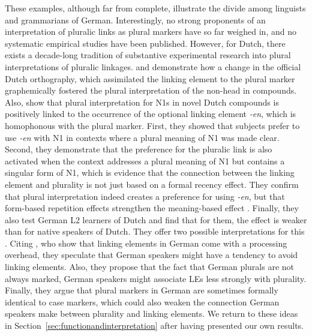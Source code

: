 These examples, although far from complete, illustrate the divide among linguists and grammarians of German.
Interestingly, no strong proponents of an interpretation of pluralic links as plural markers have so far weighed in, and no systematic empirical studies have been published.
However, for Dutch, there exists a decade-long tradition of substantive experimental research into plural interpretations of pluralic linkages.
\textcite{SchreuderEa1998} and \textcite{BangaEa2012} demonstrate how a change in the official Dutch orthography, which assimilated the linking element to the plural marker graphemically fostered the plural interpretation of the non-head in compounds.
Also, \textcite{BangaEa2013a} show that plural interpretation for N1s in novel Dutch compounds is positively linked to the occurrence of the optional linking element \textit{-en}, which is homophonous with the plural marker.
First, they showed that subjects prefer to use \textit{-en} with N1 in contexts where a plural meaning of N1 was made clear.
Second, they demonstrate that the preference for the pluralic link is also activated when the context addresses a plural meaning of N1 but contains a singular form of N1, which is evidence that the connection between the linking element and plurality is not just based on a formal recency effect.
They confirm that plural interpretation indeed creates a preference for using \textit{-en}, but that form-based repetition effects strengthen the meaning-based effect \parencite[45]{BangaEa2013a}.
Finally, they also test German L2 learners of Dutch and find that for them, the effect is weaker than for native speakers of Dutch.
They offer two possible interpretations for this \parencite[45--47]{BangaEa2013a}.
Citing \textcite{LibbenEa2002}, who show that linking elements in German come with a processing overhead, they speculate that German speakers might have a tendency to avoid linking elements.
Also, they propose that the fact that German plurals are not always marked, German speakers might associate LEs less strongly with plurality.
Finally, they argue that plural markers in German are sometimes formally identical to case markers, which could also weaken the connection German speakers make between plurality and linking elements.
We return to these ideas in Section~\ref{sec:functionandinterpretation} after having presented our own results.

